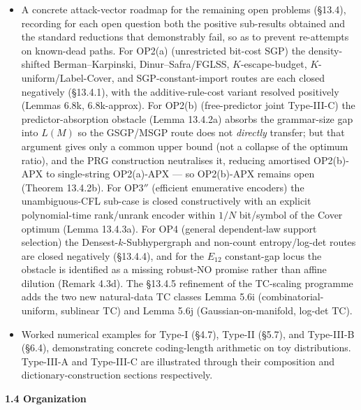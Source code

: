 \documentclass[
]{article}
\begin{document}
\begin{itemize}
  to a practical neural-LM compression pipeline with byte-granular random
  access, source-coding extensions, and the concentration/deviation
  hierarchy for archive-size fluctuations, is the subject of the companion
  Part [RNR-II]; the operational rate--distortion dispersion (the §7.34
  family) is developed in Part [RNR-III].
\item
  A concrete attack-vector roadmap for the remaining open problems
  (§13.4), recording for each open question both the positive
  sub-results obtained and the standard reductions that demonstrably
  fail, so as to prevent re-attempts on known-dead paths. For OP2(a)
  (unrestricted bit-cost SGP) the density-shifted Berman--Karpinski,
  Dinur--Safra/FGLSS, $K$-escape-budget, $K$-uniform/Label-Cover, and
  SGP-constant-import routes are each closed negatively (§13.4.1),
  with the additive-rule-cost variant resolved positively
  (Lemmas 6.8k, 6.8k-approx). For OP2(b) (free-predictor joint
  Type-III-C) the predictor-absorption obstacle (Lemma 13.4.2a)
  absorbs the grammar-size gap into $L(M)$ so the GSGP/MSGP route
  does not \emph{directly} transfer; but that argument gives only a
  common upper bound (not a collapse of the optimum ratio), and the
  PRG construction neutralises it, reducing amortised OP2(b)-APX to
  single-string OP2(a)-APX --- so OP2(b)-APX remains open
  (Theorem 13.4.2b).
  For OP3$''$ (efficient enumerative encoders) the unambiguous-CFL
  sub-case is closed constructively with an explicit polynomial-time
  rank/unrank encoder within $1/N$ bit/symbol of the Cover optimum
  (Lemma 13.4.3a). For OP4 (general dependent-law support selection)
  the Densest-$k$-Subhypergraph and non-count entropy/log-det routes
  are closed negatively (§13.4.4), and for the $E_{12}$ constant-gap
  locus the obstacle is identified as a missing robust-NO promise
  rather than affine dilution (Remark 4.3d). The §13.4.5 refinement
  of the TC-scaling programme adds the two new natural-data TC classes
  Lemma 5.6i (combinatorial-uniform, sublinear $\mathrm{TC}$) and
  Lemma 5.6j (Gaussian-on-manifold, log-det $\mathrm{TC}$).
\item
  Worked numerical examples for Type-I (§4.7), Type-II (§5.7), and
  Type-III-B (§6.4), demonstrating concrete coding-length arithmetic
  on toy distributions. Type-III-A and Type-III-C are illustrated
  through their composition and dictionary-construction sections
  respectively.
\end{itemize}

\textbf{1.4 Organization}
\end{document}
